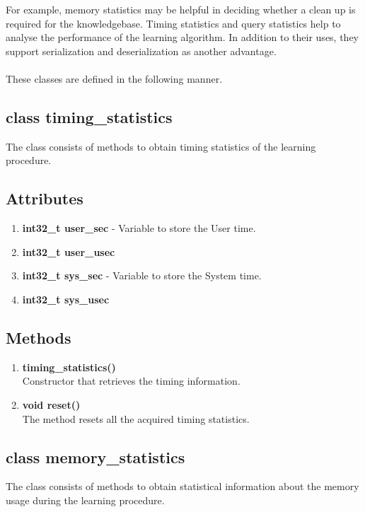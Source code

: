 For example, memory statistics may be helpful in deciding whether a clean up is required for the knowledgebase. Timing statistics and query statistics help to analyse the performance of the learning algorithm. In addition to their uses, they support serialization and deserialization as another advantage. 

\paragraph{}
These classes are defined in the following manner.

\subsection{class timing\_statistics}
The class consists of methods to obtain timing statistics of the learning procedure.
\subsection*{Attributes}
\begin{enumerate}
 \item \textbf{int32\_t user\_sec} - Variable to store the User time.
 \item \textbf{int32\_t user\_usec}
 \item \textbf{int32\_t sys\_sec} - Variable to store the System time.
 \item \textbf{int32\_t sys\_usec}
\end{enumerate}
\subsection*{Methods}
\begin{enumerate}
 \item \textbf{timing\_statistics()} \\
	Constructor that retrieves the timing information.
 \item \textbf{void reset()} \\
	The method resets all the acquired timing statistics.
\end{enumerate}

\subsection{class memory\_statistics}
The class consists of methods to obtain statistical information about the memory usage during the learning procedure. 
